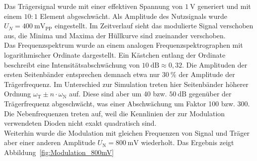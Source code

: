 \documentclass[a4paper,twoside,final]{article}
\begin{document}
Das Trägersignal wurde mit einer effektiven Spannung von $\SI{1}{\volt}$ generiert und mit einem $10:1$ Element abgeschwächt. Als Amplitude des Nutzsignals wurde $U_N = \SI{400}{\milli\volt_\text{PP}}$ eingestellt. Im Zeitverlauf sieht das modulierte Signal verschoben aus, die Minima und Maxima der Hüllkurve sind zueinander verschoben.\\
Das Frequenzspektrum wurde an einem analogen Frequenzspektrographen mit logarithmischer Ordinate dargestellt. Ein Kästchen entlang der Ordinate beschreibt eine Intensitätsabschwächung von $\SI{10}{\deci\bel} \approx 0,32$. Die Amplituden der ersten Seitenbänder entsprechen demnach etwa nur $\SI{30}{\percent}$ der Amplitude der Trägerfrequenz. Im Unterschied zur Simulation treten hier Seitenbänder höherer Ordnung $\omega_\text{T}\pm n\cdot \omega_\text{N}$ auf. Diese sind aber um 40 bzw. $\SI{50}{\deci\bel}$ gegenüber der Trägerfrequenz abgeschwächt, was einer Abschwächung um Faktor 100 bzw. 300. Die Nebenfrequenzen treten auf, weil die Kennlinien der zur Modulation verwendeten Dioden nicht exakt quadratisch sind.\\ %
Weiterhin wurde die Modulation mit gleichen Frequenzen von Signal und Träger aber einer anderen Amplitude $U_\text{N} = \SI{800}{\milli\volt}$ wiederholt. Das Ergebnis zeigt Abbildung~\ref{fig:Modulation_800mV}
\end{document}
